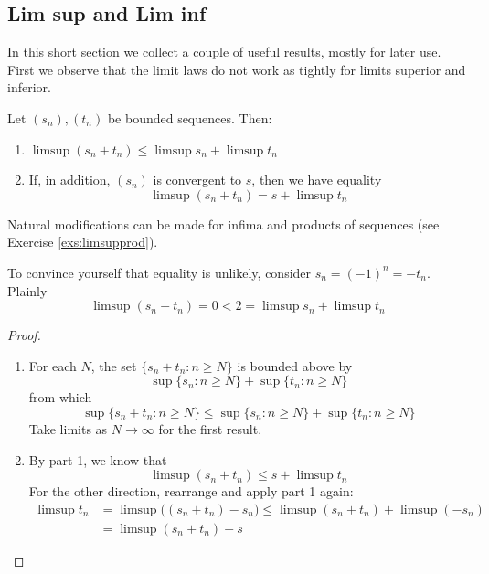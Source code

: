 \clearpage


\subsection{Lim sup and Lim inf}

In this short section we collect a couple of useful results, mostly for later use. First we observe that the limit laws do not work as tightly for limits superior and inferior.

\begin{thm}{}{}
	Let $(s_n),(t_n)$ be bounded sequences. Then:
	\begin{enumerate}
	  \item $\limsup(s_n+t_n)\le\limsup s_n+\limsup t_n$
	  \item If, in addition, $(s_n)$ is convergent to $s$, then we have equality
		\[
			\limsup(s_n+t_n)=s+\limsup t_n
		\]
	\end{enumerate}
\end{thm}

Natural modifications can be made for infima and products of sequences (see Exercise \ref{exs:limsupprod}).

\begin{example}{}{}
	To convince yourself that equality is unlikely, consider $s_n=(-1)^n=-t_n$. Plainly
	\[
		\limsup(s_n+t_n)=0<2=\limsup s_n+\limsup t_n
	\]
\end{example}

\begin{proof}
\begin{enumerate}
  \item For each $N$, the set $\{s_n+t_n:n\ge N\}$ is bounded above by
	\[
		\sup\{s_n:n\ge N\}+\sup\{t_n:n\ge N\}
	\]
	from which
	\[
		\sup\{s_n+t_n:n\ge N\}\le\sup\{s_n:n\ge N\}+\sup\{t_n:n\ge N\}
	\]
	Take limits as $N\to\infty$ for the first result.\smallbreak
	
% 	
	
	\item By part 1, we know that
	\[
		\limsup(s_n+t_n)\le s+\limsup t_n
	\]
	For the other direction, rearrange and apply part 1 again:
	\begin{align*}
		\limsup t_n&=\limsup \bigl((s_n+t_n)-s_n\bigr)\le \limsup (s_n+t_n)+\limsup(-s_n)\\
		&=\limsup(s_n+t_n)-s \tag*{\qedhere}
	\end{align*}
\end{enumerate}
\end{proof}


